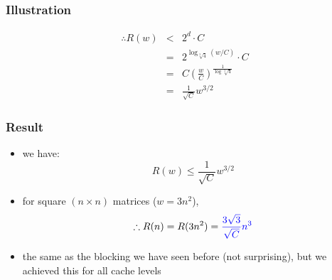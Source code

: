 \documentclass[12pt,dvipdfmx]{beamer}
\newcommand{\ao}[1]{{\color{blue}#1}}
\begin{document}
\begin{frame}
\frametitle{Illustration}
\begin{center}
\def\svgwidth{0.9\textwidth}
{\tiny}
\end{center}

\begin{eqnarray*}
\therefore R(w) & < & 2^d \cdot C  \\
                & =  & 2^{\log_{\sqrt[3]{4}}(w/C)} \cdot C \\
                & =  & C \left(\frac{w}{C}\right)^{\frac{1}{\log\sqrt[3]{4}}} \\
                & = & \frac{1}{\sqrt{C}} w^{3/2}
\end{eqnarray*}
              
\end{frame}


\begin{frame}
\frametitle{Result}
\begin{itemize}
\item we have:
\begin{equation*}
R(w) \leq \frac{1}{\sqrt{C}} w^{3/2}
\end{equation*}

\item for square $(n \times n)$ matrices ($w = 3n^2$),
\begin{equation*}
\therefore R(n) = R(3n^2) = \ao{\frac{3\sqrt{3}}{\sqrt{C}} n^3}
\end{equation*}

\item the same as the blocking we have seen before (not surprising), but
  we achieved this for all cache levels
  \end{itemize}
\end{frame}
\end{document}
